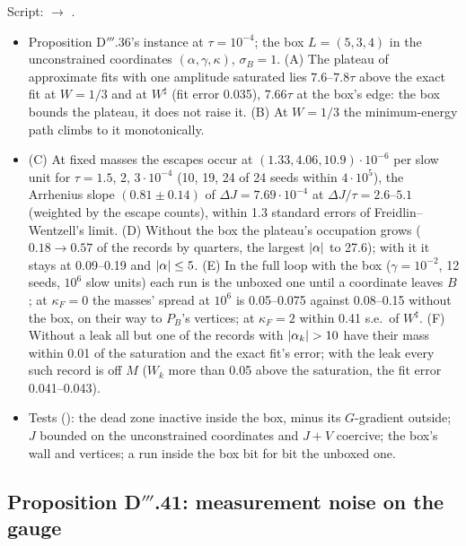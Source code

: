 Script:  $\to$ .
\begin{itemize}
  \item Proposition D$'''$.36's instance at $\tau = 10^{-4}$; the box $L = (5, 3, 4)$ in the unconstrained
    coordinates $(\alpha,\gamma,\kappa)$, $\sigma_B = 1$. (A) The plateau of approximate fits with one amplitude
    saturated lies $7.6$--$7.8\tau$ above the exact fit at $W = 1/3$ and at $W^\sharp$ (fit error 0.035), $7.66\tau$
    at the box's edge: the box bounds the plateau, it does not raise it. (B) At $W = 1/3$ the minimum-energy path
    climbs to it monotonically.
  \item (C) At fixed masses the escapes occur at $(1.33, 4.06, 10.9)\cdot10^{-6}$ per slow unit for $\tau = 1.5$, 2,
    $3\cdot10^{-4}$ (10, 19, 24 of 24 seeds within $4\cdot10^5$), the Arrhenius slope $(0.81\pm0.14)$ of
    $\Delta J = 7.69\cdot10^{-4}$ at $\Delta J/\tau = 2.6$--$5.1$ (weighted by the escape counts), within 1.3 standard
    errors of Freidlin--Wentzell's limit. (D) Without the box the plateau's occupation grows ($0.18\to0.57$ of the
    records by quarters, the largest $\lvert \alpha\rvert$ to 27.6); with it it stays at 0.09--0.19 and
    $\lvert \alpha\rvert\le5$. (E) In the full loop with the box ($\gamma = 10^{-2}$, 12 seeds, $10^6$ slow units) each run
    is the unboxed one until a coordinate leaves $B$; at $\kappa_F = 0$ the masses' spread at $10^6$ is 0.05--0.075
    against 0.08--0.15 without the box, on their way to $P_B$'s vertices; at $\kappa_F = 2$ within 0.41 s.e.\ of
    $W^\sharp$. (F) Without a leak all but one of the records with $\lvert \alpha_k\rvert > 10$ have their mass within 0.01
    of the saturation and the exact fit's error; with the leak every such record is off $M$ ($W_k$ more than 0.05
    above the saturation, the fit error 0.041--0.043).
  \item Tests (): the dead zone inactive inside the box, minus its $G$-gradient
    outside; $J$ bounded on the unconstrained coordinates and $J + V$ coercive; the box's wall and vertices; a run
    inside the box bit for bit the unboxed one.
\end{itemize}

\subsection{Proposition D\texorpdfstring{$'''$}{'''}.41: measurement noise on the gauge}

